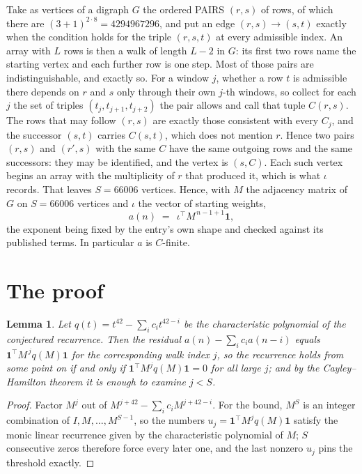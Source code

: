 \documentclass[11pt,a4paper]{article}
\theoremstyle{plain}
\newtheorem{lemma}[theorem]{Lemma}
\theoremstyle{definition}
\begin{document}
Take as vertices of a digraph $G$ the ordered PAIRS $(r,s)$ of rows, of which there are
$(3+1)^{2\cdot8}=4294967296$, and put an edge $(r,s)\to(s,t)$ exactly when the condition
holds for the triple $(r,s,t)$ at every admissible index. An array with $L$ rows is then a
walk of length $L-2$ in $G$: its first two rows name the starting vertex and each further
row is one step. Most of those pairs are indistinguishable, and exactly so. For a window $j$, whether a row $t$ is admissible there depends on $r$ and $s$ only through their own $j$-th windows, so collect for each $j$ the set of triples $(t_j,t_{j+1},t_{j+2})$ the pair allows and call that tuple $C(r,s)$. The rows that may follow $(r,s)$ are exactly those consistent with every $C_j$, and the successor $(s,t)$ carries $C(s,t)$, which does not mention $r$. Hence two pairs $(r,s)$ and $(r',s)$ with the same $C$ have the same outgoing rows and the same successors: they may be identified, and the vertex is $(s,C)$. Each such vertex begins an array with the multiplicity of $r$ that produced it, which is what $\iota$ records. That leaves $S=66006$ vertices. Hence, with $M$ the adjacency matrix of $G$ on $S=66006$ vertices and
$\iota$ the vector of starting weights,
\[
a(n)\;=\;\,\iota^{\!\top}M^{\,n-1+1}\mathbf{1},
\]
the exponent being fixed by the entry's own shape and checked against its published terms.
In particular $a$ is $C$-finite.

\section{The proof}

\begin{lemma}\label{lem:crit}
Let $q(t)=t^{42}-\sum_i c_it^{42-i}$ be the characteristic polynomial of the
conjectured recurrence. Then the residual $a(n)-\sum_ic_ia(n-i)$ equals
$\mathbf{1}^{\!\top}M^{\,j}q(M)\mathbf{1}$ for the corresponding walk index
$j$, so the recurrence holds from some point on if and only if
$\mathbf{1}^{\!\top}M^{j}q(M)\mathbf{1}=0$ for all large $j$; and by the
Cayley--Hamilton theorem it is enough to examine $j<S$.
\end{lemma}

\begin{proof}
Factor $M^{j}$ out of $M^{j+42}-\sum_ic_iM^{j+42-i}$. For the bound, $M^{S}$
is an integer combination of $I,M,\dots,M^{S-1}$, so the numbers
$u_j=\mathbf{1}^{\!\top}M^{j}q(M)\mathbf{1}$ satisfy the monic linear recurrence given by
the characteristic polynomial of $M$; $S$ consecutive zeros therefore force every later one,
and the last nonzero $u_j$ pins the threshold exactly.
\end{proof}
\end{document}
